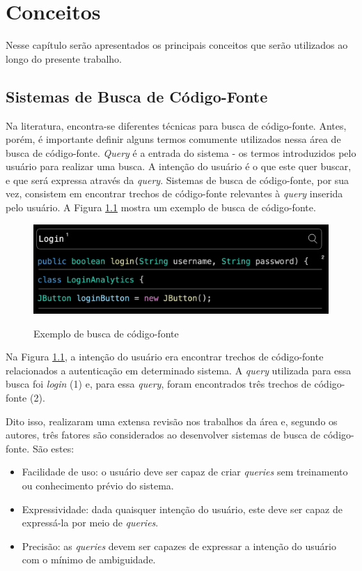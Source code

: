 \chapter{Conceitos}
\label{chp:concepts}
Nesse capítulo serão apresentados os principais conceitos que serão utilizados ao longo do presente trabalho.

\section{Sistemas de Busca de Código-Fonte}
Na literatura, encontra-se diferentes técnicas para busca de código-fonte. Antes, porém, é importante definir alguns termos comumente utilizados nessa área de busca de código-fonte. \textit{Query} é a entrada do sistema - os termos introduzidos pelo usuário para realizar uma busca. A intenção do usuário é o que este quer buscar, e que será expressa através da \textit{query}. Sistemas de busca de código-fonte, por sua vez, consistem em encontrar trechos de código-fonte relevantes à \textit{query} inserida pelo usuário. A Figura \ref{fig:concepts:code-search-structure} mostra um exemplo de busca de código-fonte.

\begin{figure}[H]
    \centering
    \caption{Exemplo de busca de código-fonte}
    \includegraphics[width=\textwidth,keepaspectratio=true]{imagens/conceitos/code-search-structure.png}
    \label{fig:concepts:code-search-structure}
\end{figure}

Na Figura \ref{fig:concepts:code-search-structure}, a intenção do usuário era encontrar trechos de código-fonte relacionados a autenticação em determinado sistema. A \textit{query} utilizada para essa busca foi \textit{login} (1) e, para essa \textit{query}, foram encontrados três trechos de código-fonte (2).

Dito isso, \textcite{Grazia2022CodeSA} realizaram uma extensa revisão nos trabalhos da área e, segundo os autores, três fatores são considerados ao desenvolver sistemas de busca de código-fonte. São estes:
\begin{itemize}
  \item Facilidade de uso: o usuário deve ser capaz de criar \textit{queries} sem treinamento ou conhecimento prévio do sistema.
  \item Expressividade: dada quaisquer intenção do usuário, este deve ser capaz de expressá-la por meio de \textit{queries}.
  \item Precisão: as \textit{queries} devem ser capazes de expressar a intenção do usuário com o mínimo de ambiguidade.
\end{itemize}

